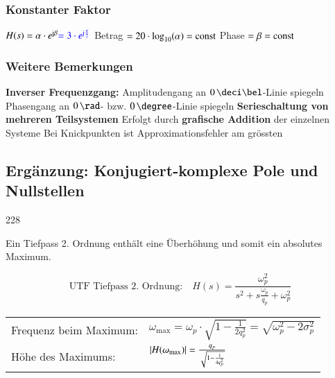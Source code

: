 \vspace{0.2cm}

\begin{minipage}[t]{0.48\columnwidth}
    \raggedright
    \subsubsection{Konstanter Faktor}

    \begin{outline}
        \1 $H(s) = \alpha \cdot e^{\mathrm{j} \beta} {\color{blue}= 3 \cdot e^{\mathrm{j} \frac{\pi}{2}}}$
            \2 Betrag $= 20 \cdot \log_{10}(\alpha) = \mathrm{const}$
            \2 Phase $= \beta = \mathrm{const}$
    \end{outline}
    
    
\end{minipage}
\hfill
\begin{minipage}[t]{0.48\columnwidth}
    \raggedright
    \subsubsection{Weitere Bemerkungen}

    \begin{outline}
        \1 \textbf{Inverser Frequenzgang:}
            \2 Amplitudengang an $0 \, \deci \bel$-Linie spiegeln
            \2 Phasengang an $0 \, \rad$- bzw. $0 \, \degree$-Linie spiegeln
        \1 \textbf{Serieschaltung von mehreren Teilsystemen}
            \2 Erfolgt durch \textbf{grafische Addition} der einzelnen Systeme
        \1 Bei Knickpunkten ist Approximationsfehler am grössten
    \end{outline}

\end{minipage}


\subsection{Ergänzung: Konjugiert-komplexe Pole und Nullstellen}{228}

Ein Tiefpass 2. Ordnung enthält eine Überhöhung und somit ein absolutes Maximum. 

$$ \text{UTF Tiefpass 2. Ordnung:} \quad H(s) = \frac{\omega_p^2}{s^2 + s \frac{\omega_p}{q_p} + \omega_p^2} $$

\begin{tabular}{ll}
    \strut Frequenz beim Maximum:  & $ \omega_{\max} = \omega_p \cdot \sqrt{1 - \frac{1}{2 q_p^2}} = \sqrt{\omega_p^2 - 2 \sigma_p^2}$ \\
    \strut Höhe des Maximums:      & $ \left|H(\omega_{\max})\right| = \frac{q_p}{\sqrt{1 - \frac{1}{4 q_p^2}}}$
\end{tabular}


